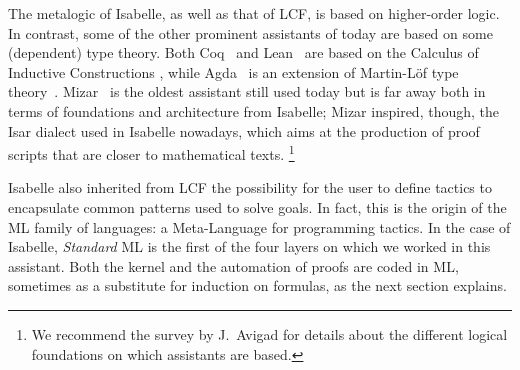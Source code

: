 The metalogic of Isabelle, as well as that of LCF, is based on higher-order logic.
In contrast, some of the other prominent assistants of today are
based on some (dependent) type theory. Both Coq~\cite{coq} and
Lean~\cite{DBLP:conf/cade/Moura021} are based on the Calculus of
Inductive Constructions
\cite{DBLP:conf/mfps/PfenningP89,DBLP:journals/iandc/CoquandH88},
while Agda~\cite{agda} is an extension of Martin-Löf type
theory~\cite{DBLP:books/daglib/0000395}. Mizar~\cite{mizar} is the
oldest assistant still used today but is far away both in terms of
foundations and architecture from Isabelle; Mizar inspired, though, the
Isar \cite{DBLP:conf/tphol/Wenzel99} dialect used in Isabelle
nowadays, which aims at the production of proof scripts that are
closer to mathematical texts.%
\footnote{%
We recommend the survey \cite{2020arXiv200909541A} by
J.~Avigad for details about the different logical foundations on which
assistants are based.}

%

Isabelle also inherited from LCF the possibility for the user to define
tactics to encapsulate common patterns used to solve goals. In
fact, this is the origin of the ML family of languages: a
Meta-Language for programming tactics.
In the case of Isabelle, \emph{Standard} ML is the first of the four layers
on which we worked in this assistant. Both the kernel and the automation
of proofs are coded in ML, sometimes as a substitute for induction on
formulas, as the next section explains.

